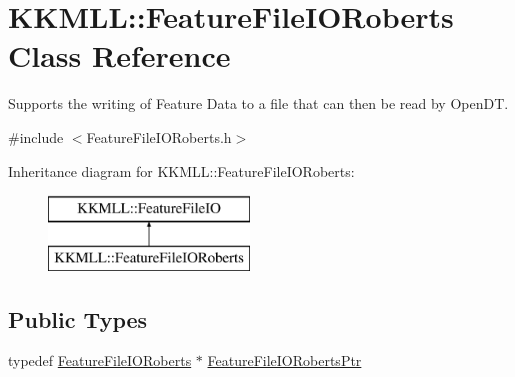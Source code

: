 \hypertarget{class_k_k_m_l_l_1_1_feature_file_i_o_roberts}{}\section{K\+K\+M\+LL\+:\+:Feature\+File\+I\+O\+Roberts Class Reference}
\label{class_k_k_m_l_l_1_1_feature_file_i_o_roberts}


Supports the writing of Feature Data to a file that can then be read by Open\+DT.  




{\ttfamily \#include $<$Feature\+File\+I\+O\+Roberts.\+h$>$}

Inheritance diagram for K\+K\+M\+LL\+:\+:Feature\+File\+I\+O\+Roberts\+:\begin{figure}[H]
\begin{center}
\leavevmode
\includegraphics[height=2.000000cm]{class_k_k_m_l_l_1_1_feature_file_i_o_roberts}
\end{center}
\end{figure}
\subsection*{Public Types}
\begin{DoxyCompactItemize}
\item 
typedef \hyperlink{class_k_k_m_l_l_1_1_feature_file_i_o_roberts}{Feature\+File\+I\+O\+Roberts} $\ast$ \hyperlink{class_k_k_m_l_l_1_1_feature_file_i_o_roberts_ae26de443b3cf09b54cbadd52770bf10c}{Feature\+File\+I\+O\+Roberts\+Ptr}
\end{DoxyCompactItemize}
